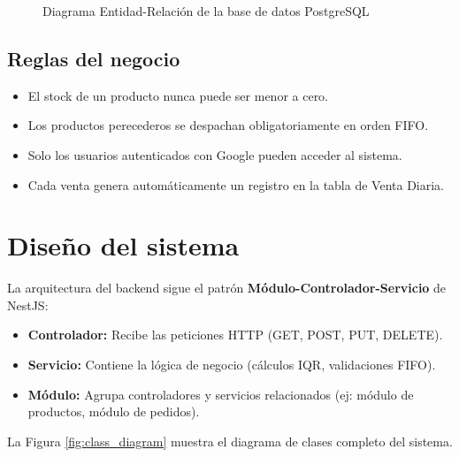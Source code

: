 \documentclass[12pt, a4paper]{article}
\begin{document}
\begin{figure}[H]
\begin{tikzpicture}
\end{tikzpicture}
\caption{Diagrama Entidad-Relación de la base de datos PostgreSQL}
\label{fig:er_diagram}
\end{figure}

\subsection{Reglas del negocio}
\begin{itemize}
    \item El stock de un producto nunca puede ser menor a cero.
    \item Los productos perecederos se despachan obligatoriamente en orden FIFO.
    \item Solo los usuarios autenticados con Google pueden acceder al sistema.
    \item Cada venta genera automáticamente un registro en la tabla de Venta Diaria.
\end{itemize}

\section{Diseño del sistema}
La arquitectura del backend sigue el patrón \textbf{Módulo-Controlador-Servicio} de NestJS:
\begin{itemize}
    \item \textbf{Controlador:} Recibe las peticiones HTTP (GET, POST, PUT, DELETE).
    \item \textbf{Servicio:} Contiene la lógica de negocio (cálculos IQR, validaciones FIFO).
    \item \textbf{Módulo:} Agrupa controladores y servicios relacionados (ej: módulo de productos, módulo de pedidos).
\end{itemize}

La Figura \ref{fig:class_diagram} muestra el diagrama de clases completo del sistema.
\end{document}
